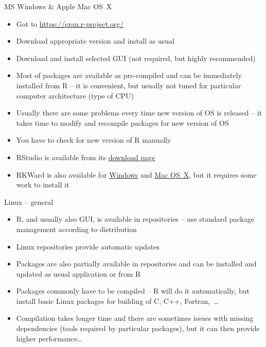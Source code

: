 \documentclass[compress, ucs, xelatex, 11pt, xcolor=svgnames,
  hyperref={
    bookmarks=true,
    unicode=true,
    colorlinks=true,
    pdftitle={Molecular data in R},
    plainpages=false,
    pdfauthor={Vojtech Zeisek},
    pdfsubject={Course about phylogeny and evolution in R},
    pdfcreator={XeLaTeX},
    pdfkeywords={R, evolution, phylogeny, molecular data},
    linkcolor=Tomato,
    anchorcolor=SaddleBrown,
    citecolor=Goldenrod,
    filecolor=DarkMagenta,
    menucolor=Sienna,
    urlcolor=DarkTurquoise,
    pdftex},
  url={hyphens, lowtilde} %
  ]{beamer}
\begin{document}
\begin{frame}{MS Windows \& Apple Mac OS~X}
  \begin{itemize}
    \item Got to \url{https://cran.r-project.org/}
    \item Download appropriate version and install as usual
    \item Download and install selected GUI (not required, but highly recommended)
    \item Most of packages are available as pre-compiled and can be immediately installed from R -- it is convenient, but usually not tuned for particular computer architecture (type of CPU)
    \item Usually there are some problems every time new version of OS is released -- it takes time to modify and recompile packages for new version of OS
    \item You have to check for new version of R manually
    \item RStudio is available from its \href{https://www.rstudio.com/products/rstudio/download/\#download}{download page}
    \item RKWard is also available for \href{https://rkward.kde.org/RKWard_on_Windows}{Windows} and \href{https://rkward.kde.org/RKWard_on_Mac}{Mac OS~X}, but it requires some work to install it
  \end{itemize}
\end{frame}

\begin{frame}{Linux -- general}
  \begin{itemize}
    \item R, and usually also GUI, is available in repositories -- use standard package management according to distribution
    \item Linux repositories provide automatic updates
    \item Packages are also partially available in repositories and can be installed and updated as usual application or from R
    \item Packages commonly have to be compiled -- R will do it automatically, but install basic Linux packages for building of C, C++, Fortran,~\ldots
    \item Compilation takes longer time and there are sometimes issues with missing dependencies (tools required by particular packages), but it can then provide higher performance\ldots
  \end{itemize}
\end{frame}
\end{document}
